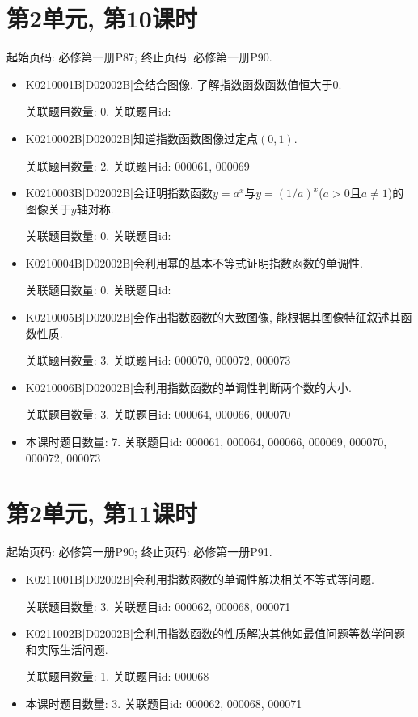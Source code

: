 \section*{第2单元, 第10课时}
起始页码: 必修第一册P87; 终止页码: 必修第一册P90.
\begin{itemize}
\item K0210001B|D02002B|会结合图像, 了解指数函数函数值恒大于$0$.

关联题目数量: 0. 关联题目id: 

\item K0210002B|D02002B|知道指数函数图像过定点$(0,1)$.

关联题目数量: 2. 关联题目id: 000061, 000069

\item K0210003B|D02002B|会证明指数函数$y=a^{x}$与$y=(1/a)^{x}$($a>0$且$a\neq1$)的图像关于$y$轴对称.

关联题目数量: 0. 关联题目id: 

\item K0210004B|D02002B|会利用幂的基本不等式证明指数函数的单调性.

关联题目数量: 0. 关联题目id: 

\item K0210005B|D02002B|会作出指数函数的大致图像, 能根据其图像特征叙述其函数性质.

关联题目数量: 3. 关联题目id: 000070, 000072, 000073

\item K0210006B|D02002B|会利用指数函数的单调性判断两个数的大小.

关联题目数量: 3. 关联题目id: 000064, 000066, 000070

\item 本课时题目数量: 7. 关联题目id: 000061, 000064, 000066, 000069, 000070, 000072, 000073

\end{itemize}

\section*{第2单元, 第11课时}
起始页码: 必修第一册P90; 终止页码: 必修第一册P91.
\begin{itemize}
\item K0211001B|D02002B|会利用指数函数的单调性解决相关不等式等问题.

关联题目数量: 3. 关联题目id: 000062, 000068, 000071

\item K0211002B|D02002B|会利用指数函数的性质解决其他如最值问题等数学问题和实际生活问题.

关联题目数量: 1. 关联题目id: 000068

\item 本课时题目数量: 3. 关联题目id: 000062, 000068, 000071

\end{itemize}

